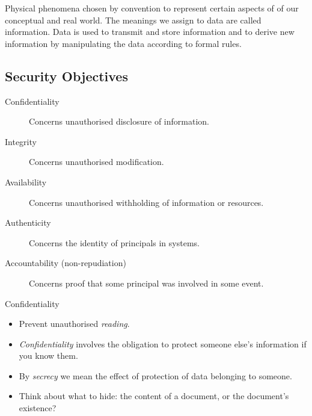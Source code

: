 \documentclass{beamer}
\begin{document}
\begin{frame}{\insertsubsectionhead}
  \begin{definition}
    Physical phenomena chosen by convention to represent certain aspects of of 
    our conceptual and real world.
    The meanings we assign to data are called information.
    Data is used to transmit and store information and to derive new 
    information by manipulating the data according to formal rules.
  \end{definition}
\end{frame}

\subsection{Security Objectives}

\begin{frame}{\insertsubsectionhead}
  \begin{description}
    \item[Confidentiality] Concerns unauthorised disclosure of information.
    \item[Integrity] Concerns unauthorised modification.
    \item[Availability] Concerns unauthorised withholding of information or 
      resources.
    \item[Authenticity] Concerns the identity of principals in systems.
    \item[Accountability (non-repudiation)] Concerns proof that some principal 
      was involved in some event.
  \end{description}
\end{frame}

\begin{frame}{\insertsubsectionhead}{Confidentiality}
  \begin{itemize}
    \item Prevent unauthorised \emph{reading}.

    \item \emph{Confidentiality} involves the obligation to protect someone 
      else's information if you know them.

    \item By \emph{secrecy} we mean the effect of protection of data belonging 
      to someone.

    \item Think about what to hide: the content of a document, or the 
      document's existence?
  \end{itemize}
\end{frame}
\end{document}
